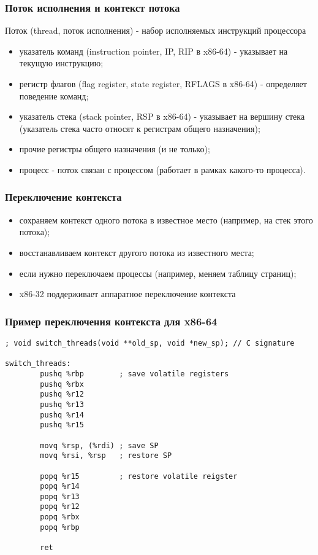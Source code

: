 \begin{frame}
\frametitle{Поток исполнения и контекст потока}
Поток (thread, поток исполнения) - набор исполняемых инструкций процессора
\begin{itemize}
  \item указатель команд (instruction pointer, IP, RIP в x86-64) - указывает на
        текущую инструкцию;
  \item регистр флагов (flag register, state register, RFLAGS в x86-64) -
        определяет поведение команд;
  \item указатель стека (stack pointer, RSP в x86-64) - указывает на вершину
        стека (указатель стека часто относят к регистрам общего назначения);
  \item прочие регистры общего назначения (и не только);
  \item процесс - поток связан с процессом (работает в рамках какого-то
        процесса).
\end{itemize}
\end{frame}

\begin{frame}
\frametitle{Переключение контекста}

\begin{itemize}
  \item сохраняем контекст одного потока в известное место (например, на стек
        этого потока);
  \item восстанавливаем контекст другого потока из известного места;
  \item если нужно переключаем процессы (например, меняем таблицу страниц);
  \item x86-32 поддерживает аппаратное переключение контекста
\end{itemize}
\end{frame}

\begin{frame}[fragile]
\frametitle{Пример переключения контекста для x86-64}

\begin{lstlisting}
; void switch_threads(void **old_sp, void *new_sp); // C signature

switch_threads:
        pushq %rbp        ; save volatile registers
        pushq %rbx
        pushq %r12
        pushq %r13
        pushq %r14
        pushq %r15

        movq %rsp, (%rdi) ; save SP
        movq %rsi, %rsp   ; restore SP

        popq %r15         ; restore volatile reigster
        popq %r14
        popq %r13
        popq %r12
        popq %rbx
        popq %rbp

        ret
\end{lstlisting}
\end{frame}

